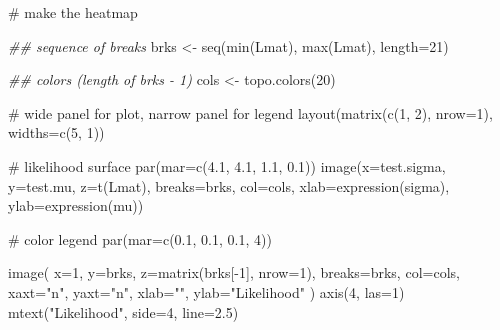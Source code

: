 \documentclass[
  13,
  letterpaper,
]{report}
\newenvironment{Shaded}{\begin{snugshade}}{\end{snugshade}}
\newcommand{\AttributeTok}[1]{\textcolor[rgb]{0.40,0.45,0.13}{#1}}
\newcommand{\CommentTok}[1]{\textcolor[rgb]{0.37,0.37,0.37}{#1}}
\newcommand{\DecValTok}[1]{\textcolor[rgb]{0.68,0.00,0.00}{#1}}
\newcommand{\DocumentationTok}[1]{\textcolor[rgb]{0.37,0.37,0.37}{\textit{#1}}}
\newcommand{\FloatTok}[1]{\textcolor[rgb]{0.68,0.00,0.00}{#1}}
\newcommand{\FunctionTok}[1]{\textcolor[rgb]{0.28,0.35,0.67}{#1}}
\newcommand{\NormalTok}[1]{\textcolor[rgb]{0.00,0.23,0.31}{#1}}
\newcommand{\OtherTok}[1]{\textcolor[rgb]{0.00,0.23,0.31}{#1}}
\newcommand{\SpecialCharTok}[1]{\textcolor[rgb]{0.37,0.37,0.37}{#1}}
\newcommand{\StringTok}[1]{\textcolor[rgb]{0.13,0.47,0.30}{#1}}
\begin{document}
\begin{Shaded}
\begin{Highlighting}[]
\CommentTok{\# make the heatmap}

\DocumentationTok{\#\# sequence of breaks}
\NormalTok{brks }\OtherTok{\textless{}{-}} \FunctionTok{seq}\NormalTok{(}\FunctionTok{min}\NormalTok{(Lmat), }\FunctionTok{max}\NormalTok{(Lmat), }\AttributeTok{length=}\DecValTok{21}\NormalTok{)}

\DocumentationTok{\#\# colors (length of brks {-} 1)}
\NormalTok{cols }\OtherTok{\textless{}{-}} \FunctionTok{topo.colors}\NormalTok{(}\DecValTok{20}\NormalTok{)}

\CommentTok{\# wide panel for plot, narrow panel for legend}
\FunctionTok{layout}\NormalTok{(}\FunctionTok{matrix}\NormalTok{(}\FunctionTok{c}\NormalTok{(}\DecValTok{1}\NormalTok{, }\DecValTok{2}\NormalTok{), }\AttributeTok{nrow=}\DecValTok{1}\NormalTok{), }\AttributeTok{widths=}\FunctionTok{c}\NormalTok{(}\DecValTok{5}\NormalTok{, }\DecValTok{1}\NormalTok{))}

\CommentTok{\# likelihood surface}
\FunctionTok{par}\NormalTok{(}\AttributeTok{mar=}\FunctionTok{c}\NormalTok{(}\FloatTok{4.1}\NormalTok{, }\FloatTok{4.1}\NormalTok{, }\FloatTok{1.1}\NormalTok{, }\FloatTok{0.1}\NormalTok{))}
\FunctionTok{image}\NormalTok{(}\AttributeTok{x=}\NormalTok{test.sigma, }\AttributeTok{y=}\NormalTok{test.mu, }\AttributeTok{z=}\FunctionTok{t}\NormalTok{(Lmat),}
      \AttributeTok{breaks=}\NormalTok{brks, }\AttributeTok{col=}\NormalTok{cols,}
      \AttributeTok{xlab=}\FunctionTok{expression}\NormalTok{(sigma),}
      \AttributeTok{ylab=}\FunctionTok{expression}\NormalTok{(mu))}

\CommentTok{\# color legend}
\FunctionTok{par}\NormalTok{(}\AttributeTok{mar=}\FunctionTok{c}\NormalTok{(}\FloatTok{0.1}\NormalTok{, }\FloatTok{0.1}\NormalTok{, }\FloatTok{0.1}\NormalTok{, }\DecValTok{4}\NormalTok{))}

\FunctionTok{image}\NormalTok{(}
  \AttributeTok{x=}\DecValTok{1}\NormalTok{,}
  \AttributeTok{y=}\NormalTok{brks,}
  \AttributeTok{z=}\FunctionTok{matrix}\NormalTok{(brks[}\SpecialCharTok{{-}}\DecValTok{1}\NormalTok{], }\AttributeTok{nrow=}\DecValTok{1}\NormalTok{),}
  \AttributeTok{breaks=}\NormalTok{brks,}
  \AttributeTok{col=}\NormalTok{cols,}
  \AttributeTok{xaxt=}\StringTok{"n"}\NormalTok{, }\AttributeTok{yaxt=}\StringTok{"n"}\NormalTok{,}
  \AttributeTok{xlab=}\StringTok{""}\NormalTok{,}
  \AttributeTok{ylab=}\StringTok{"Likelihood"}
\NormalTok{)}
\FunctionTok{axis}\NormalTok{(}\DecValTok{4}\NormalTok{, }\AttributeTok{las=}\DecValTok{1}\NormalTok{)}
\FunctionTok{mtext}\NormalTok{(}\StringTok{"Likelihood"}\NormalTok{, }\AttributeTok{side=}\DecValTok{4}\NormalTok{, }\AttributeTok{line=}\FloatTok{2.5}\NormalTok{)}
\end{Highlighting}
\end{Shaded}
\end{document}
